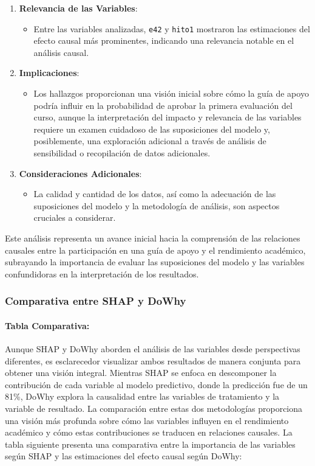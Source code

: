 \begin{enumerate}
    \item \textbf{Relevancia de las Variables}:
        \begin{itemize}
            \item Entre las variables analizadas, \texttt{e42} y \texttt{hito1} mostraron las estimaciones del efecto causal más prominentes, indicando una relevancia notable en el análisis causal.
        \end{itemize}
    
    \item \textbf{Implicaciones}:
        \begin{itemize}
            \item Los hallazgos proporcionan una visión inicial sobre cómo la guía de apoyo podría influir en la probabilidad de aprobar la primera evaluación del curso, aunque la interpretación del impacto y relevancia de las variables requiere un examen cuidadoso de las suposiciones del modelo y, posiblemente, una exploración adicional a través de análisis de sensibilidad o recopilación de datos adicionales.
        \end{itemize}
    
    \item \textbf{Consideraciones Adicionales}:
        \begin{itemize}
            \item La calidad y cantidad de los datos, así como la adecuación de las suposiciones del modelo y la metodología de análisis, son aspectos cruciales a considerar.
        \end{itemize}
\end{enumerate}

Este análisis representa un avance inicial hacia la comprensión de las relaciones causales entre la participación en una guía de apoyo y el rendimiento académico, subrayando la importancia de evaluar las suposiciones del modelo y las variables confundidoras en la interpretación de los resultados.

\subsubsection{Comparativa entre SHAP y DoWhy}

\paragraph{Tabla Comparativa:} Aunque SHAP y DoWhy aborden el análisis de las variables desde perspectivas diferentes, es esclarecedor visualizar ambos resultados de manera conjunta para obtener una visión integral. Mientras SHAP se enfoca en descomponer la contribución de cada variable al modelo predictivo, donde la predicción fue de un 81\%, DoWhy explora la causalidad entre las variables de tratamiento y la variable de resultado. La comparación entre estas dos metodologías proporciona una visión más profunda sobre cómo las variables influyen en el rendimiento académico y cómo estas contribuciones se traducen en relaciones causales. La tabla siguiente presenta una comparativa entre la importancia de las variables según SHAP y las estimaciones del efecto causal según DoWhy:

